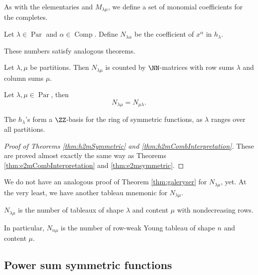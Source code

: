 \documentclass{article}
\DeclareMathOperator{\Par}{Par}
\DeclareMathOperator{\Com}{Comp}
\begin{document}
As with the elementaries and $M_{\lambda\mu}$, we define a set of monomial coefficients for the completes.

\begin{definition}
    Let $\lambda \in \Par$ and $\alpha \in \Com$. Define $N_{\lambda\alpha}$ be the coefficient of $x^\alpha$ in $h_\lambda$.
\end{definition}

These numbers satisfy analogous theorems.

\begin{theorem} \label{thm:h2mCombInterpretation}
    Let $\lambda, \mu$ be partitions. Then $N_{\lambda\mu}$ is counted by $\NN$-matrices with row sums $\lambda$ and column sums $\mu$.
\end{theorem}

\begin{theorem} \label{thm:h2mSymmetric}
    Let $\lambda, \mu \in \Par$, then
    \[
        N_{\lambda\mu} = N_{\mu\lambda}.
    \]
\end{theorem}

\begin{theorem}
    \label{thm:hAreBasis}
    The $h_\lambda$'s form a $\ZZ$-basis for the ring of symmetric functions, as $\lambda$ ranges over all partitions.
\end{theorem}

\begin{proof}[Proof of Theorems \ref{thm:h2mSymmetric} and \ref{thm:h2mCombInterpretation}]
    These are proved almost exactly the same way as Theorems \ref{thm:e2mCombInterpretation} and \ref{thm:e2msymmetric}.
\end{proof}

We do not have an analogous proof of Theorem \ref{thm:galeryser} for $N_{\lambda\mu}$, yet.
At the very least, we have another tableau mnemonic for $N_{\lambda\mu}$.

\begin{theorem}
    $N_{\lambda\mu}$ is the number of tableaux of shape $\lambda$ and content $\mu$ with nondecreasing rows. 

    In particular, $N_{n\mu}$ is the number of row-weak Young tableau of shape $n$ and content $\mu$.
\end{theorem}

\subsection{Power sum symmetric functions}
\end{document}
